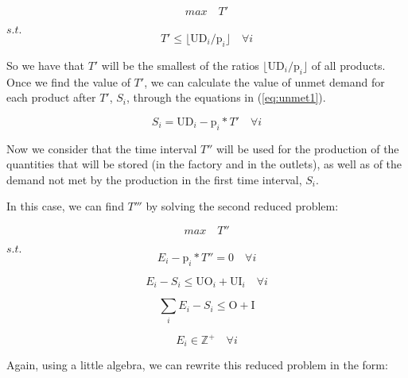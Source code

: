 \documentclass[preprint,12pt,authoryear]{elsarticle}
\begin{document}
\begin{equation}
max \quad T'
\end{equation}

$s.t.$ \\

\begin{equation}
T'  \leq \lfloor{\textrm{UD}_i / \textrm{p}_i}\rfloor \quad \forall i
\end{equation}

So we have that $T'$ will be the smallest of the ratios $\lfloor{\textrm{UD}_i / \textrm{p}_i}\rfloor$ of all products. \\

Once we find the value of $T'$, we can calculate the value of unmet demand for each product after $T'$, $S_i$, through the equations in (\ref{eq:unmet1}).

\begin{equation}
\label{eq:unmet1}
S_i = \textrm{UD}_i - \textrm{p}_i * T' \quad \forall i
\end{equation}

Now we consider that the time interval $T''$ will be used for the production of the quantities that will be stored (in the factory and in the outlets), as well as of the demand not met by the production in the first time interval, $S_i$. 

In this case, we can find $T'''$ by solving the second reduced problem:

\begin{equation}
max \quad T''
\end{equation}

$s.t.$ \\

\begin{equation}
E_i - \textrm{p}_i * T''  = 0 \quad \forall i
\end{equation}

\begin{equation}
E_i - S_i \leq \textrm{UO}_i + \textrm{UI}_i \quad \forall i
\end{equation}

\begin{equation}
\sum_i {E_i - S_i} \leq \textrm{O} + \textrm{I}
\end{equation}

\begin{equation}
E_i \in  \mathbb{Z}^+ \quad \forall i
\end{equation}

Again, using a little algebra, we can rewrite this reduced problem in the form:
\end{document}
